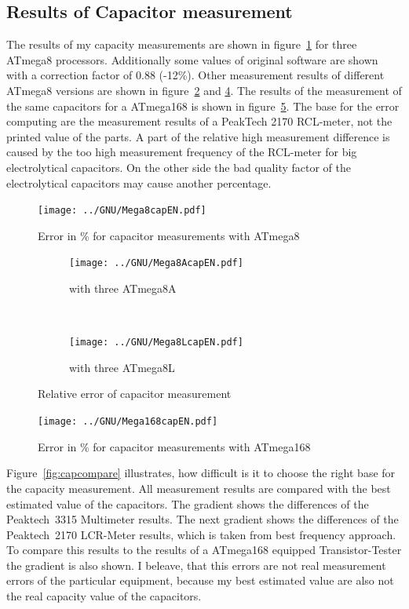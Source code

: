 \subsection{Results of Capacitor measurement}
The results of my capacity measurements are shown in figure~\ref{fig:mega8cap} for three ATmega8 processors.
Additionally some values of original software are shown with a correction factor of 0.88 (-12\%).
Other measurement results of different ATmega8 versions are shown in figure~\ref{fig:mega8Acap} and \ref{fig:mega8Lcap}.
The results of the measurement of the same capacitors for a ATmega168 is shown in figure~\ref{fig:mega168cap}.
The base for the error computing are the measurement results of a PeakTech 2170 RCL-meter, not the printed value
of the parts.
A part of the relative high measurement difference is caused by the too high measurement frequency of the RCL-meter for big
electrolytical capacitors. On the other side the bad quality factor of the electrolytical capacitors may cause
another percentage.

\begin{figure}[H]
\centering
\texttt{[image: ../GNU/Mega8capEN.pdf]}
\caption{Error in \% for capacitor measurements with ATmega8 }
\label{fig:mega8cap}
\end{figure}

\begin{figure}[H]
  \begin{subfigure}[b]{.5\textwidth}
    \centering
    \texttt{[image: ../GNU/Mega8AcapEN.pdf]}
    \caption{with three ATmega8A}
    \label{fig:mega8Acap}
  \end{subfigure}
  ~
  \begin{subfigure}[b]{.5\textwidth}
    \centering
    \texttt{[image: ../GNU/Mega8LcapEN.pdf]}
    \caption{with three ATmega8L}
    \label{fig:mega8Lcap}
  \end{subfigure}
  \caption{Relative error of capacitor measurement}
\end{figure}

\begin{figure}[H]
\centering
\texttt{[image: ../GNU/Mega168capEN.pdf]}
\caption{Error in \% for capacitor measurements with ATmega168 }
\label{fig:mega168cap}
\end{figure}

Figure~\ref{fig:capcompare} illustrates, how difficult is it to choose the right base for the capacity measurement.
All measurement results are compared with the best estimated value of the capacitors.
The gradient  shows the differences of the Peaktech~3315 Multimeter results.
The next gradient  shows the differences of the Peaktech~2170 LCR-Meter results, which is taken from best frequency approach.
To compare this results to the results of a ATmega168 equipped Transistor-Tester the gradient  is also shown.
I beleave, that this errors are not real measurement errors of the particular equipment, because my best estimated value are
also not the real capacity value of the capacitors.

